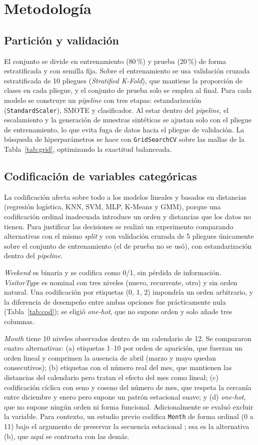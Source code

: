 \documentclass[conference]{IEEEtran}
\begin{document}
\section{Metodología}

\subsection{Partición y validación}
El conjunto se divide en entrenamiento (80\,\%) y prueba (20\,\%) de forma estratificada y con semilla fija. Sobre el entrenamiento se usa validación cruzada estratificada de 10 pliegues (\emph{Stratified K-Fold}), que mantiene la proporción de clases en cada pliegue, y el conjunto de prueba solo se emplea al final. Para cada modelo se construye un \emph{pipeline} con tres etapas: estandarización (\texttt{StandardScaler}), SMOTE y clasificador. Al estar dentro del \emph{pipeline}, el escalamiento y la generación de muestras sintéticas se ajustan solo con el pliegue de entrenamiento, lo que evita fuga de datos hacia el pliegue de validación. La búsqueda de hiperparámetros se hace con \texttt{GridSearchCV} sobre las mallas de la Tabla~\ref{tab:grid}, optimizando la exactitud balanceada.

\subsection{Codificación de variables categóricas}
\label{sec:cod}
La codificación afecta sobre todo a los modelos lineales y basados en distancias (regresión logística, KNN, SVM, MLP, K-Means y GMM), porque una codificación ordinal inadecuada introduce un orden y distancias que los datos no tienen. Para justificar las decisiones se realizó un experimento comparando alternativas con el mismo \emph{split} y con validación cruzada de 5 pliegues únicamente sobre el conjunto de entrenamiento (el de prueba no se usó), con estandarización dentro del \emph{pipeline}.

\textit{Weekend} es binaria y se codifica como 0/1, sin pérdida de información. \textit{VisitorType} es nominal con tres niveles (nuevo, recurrente, otro) y sin orden natural. Una codificación por etiquetas (0, 1, 2) impondría un orden arbitrario, y la diferencia de desempeño entre ambas opciones fue prácticamente nula (Tabla~\ref{tab:cod}); se eligió \emph{one-hot}, que no supone orden y solo añade tres columnas.

\textit{Month} tiene 10 niveles observados dentro de un calendario de 12. Se compararon cuatro alternativas: (a) etiquetas 1--10 por orden de aparición, que fuerzan un orden lineal y comprimen la ausencia de abril (marzo y mayo quedan consecutivos); (b) etiquetas con el número real del mes, que mantienen las distancias del calendario pero tratan el efecto del mes como lineal; (c) codificación cíclica con seno y coseno del número de mes, que respeta la cercanía entre diciembre y enero pero supone un patrón estacional suave; y (d) \emph{one-hot}, que no supone ningún orden ni forma funcional. Adicionalmente se evaluó excluir la variable. Para contexto, un estudio previo codifica \texttt{Month} de forma ordinal (0 a 11) bajo el argumento de preservar la secuencia estacional \cite{alamuri2026}; esa es la alternativa (b), que aquí se contrasta con las demás.
\end{document}
